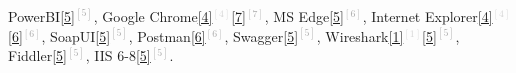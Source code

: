 \begin{cventries}
{\begin{cvitems}
{		\textcolor{rainbowcolor-olive}{PowerBI\textcolor{darkgray}{\ref{5}{$^{[5]}$}}}, 
        \textcolor{rainbowcolor-olive}{Google Chrome\textcolor{lightgray}{\ref{4}{$^{[4]}$}}\textcolor{darkgray}{\ref{7}{$^{[7]}$}}},
        \textcolor{rainbowcolor-olive}{MS Edge\textcolor{darkgray}{\ref{5}{$^{[6]}$}}},
        \textcolor{rainbowcolor-olive}{Internet Explorer\textcolor{lightgray}{\ref{4}{$^{[4]}$}}\textcolor{darkgray}{\ref{6}{$^{[6]}$}}},
        \textcolor{rainbowcolor-olive}{SoapUI\textcolor{darkgray}{\ref{5}{$^{[5]}$}}},
        \textcolor{rainbowcolor-olive}{Postman\textcolor{darkgray}{\ref{6}{$^{[6]}$}}},
        \textcolor{rainbowcolor-olive}{Swagger\textcolor{darkgray}{\ref{5}{$^{[5]}$}}},    
        \textcolor{rainbowcolor-olive}{Wireshark\textcolor{lightgray}{\ref{1}{$^{[1]}$}}\textcolor{darkgray}{\ref{5}{$^{[5]}$}}},    
        \textcolor{rainbowcolor-olive}{Fiddler\textcolor{darkgray}{\ref{5}{$^{[5]}$}}},  
        \textcolor{rainbowcolor-olive}{IIS 6-8\textcolor{darkgray}{\ref{5}{$^{[5]}$}}}.%
		}
      \end{cvitems}
    }  
      

\end{cventries}

